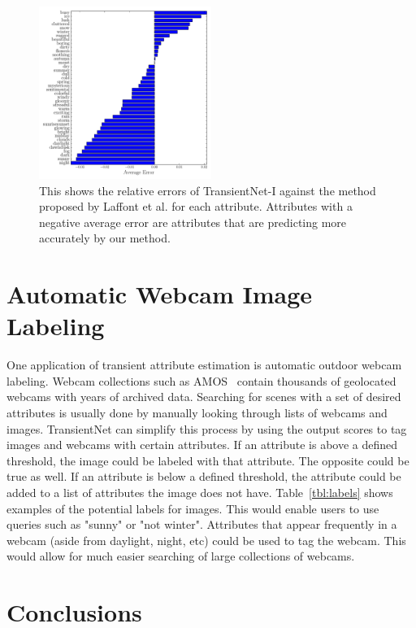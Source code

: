 \documentclass{article}
\newcommand{\tblref}[1]{Table~\ref{tbl:#1}}
\begin{document}
\begin{figure}[t!]
	\centering
		\includegraphics[width=0.5\textwidth]{figs/rel_err_cmr.pdf}
		\caption{This shows the relative errors of TransientNet-I against the method 
						 proposed by Laffont et al. for each attribute.  Attributes with a 
						 negative average error are attributes that are predicting more 
						 accurately by our method.}
		\label{fig:relerr}
\end{figure}

\section{Automatic Webcam Image Labeling}
\indent

One application of transient attribute estimation is automatic outdoor
webcam labeling. Webcam collections such as AMOS~\cite{jacobs07amos} contain
thousands of geolocated webcams with years of archived data.  Searching
for scenes with a set of desired attributes is usually done by manually
looking through lists of webcams and images.  TransientNet can simplify this
process by using the output scores to tag images and webcams with certain 
attributes.  If an attribute is above a defined threshold, the image could 
be labeled with that attribute.  The opposite could be true as well.  If an
attribute is below a defined threshold, the attribute could be added to a 
list of attributes the image does not have.  \tblref{labels} shows examples of
the potential labels for images. This would enable users to use queries such 
as "sunny" or "not winter".  Attributes that appear frequently in a webcam 
(aside from daylight, night, etc) could be used to tag the webcam.  This would 
allow for much easier searching of large collections of webcams.

\section{Conclusions}
\indent
\end{document}
